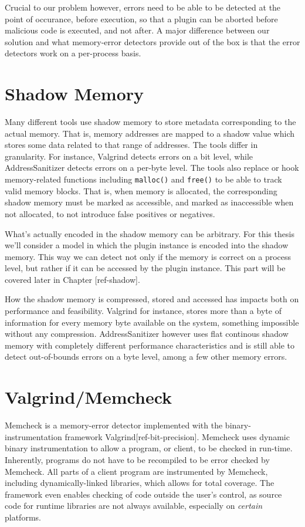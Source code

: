 Crucial to our problem however, errors need to be able to be detected at the
point of occurance, before execution, so that a plugin can be aborted before
malicious code is executed, and not after.
A major difference between our solution and what memory-error detectors provide
out of the box is that the error detectors work on a per-process basis.


\section {Shadow Memory}

Many different tools use shadow memory to store metadata corresponding to the
actual memory.
That is, memory addresses are mapped to a shadow value which stores some data
related to that range of addresses.
The tools differ in granularity.
For instance, Valgrind detects errors on a bit level, while AddressSanitizer
detects errors on a per-byte level.
The tools also replace or hook memory-related functions including
\texttt{malloc()} and \texttt{free()} to be able to track valid memory blocks.
That is, when memory is allocated, the corresponding shadow memory must be
marked as accessible, and marked as inaccessible when not allocated, to not
introduce false positives or negatives.

What's actually encoded in the shadow memory can be arbitrary.
For this thesis we'll consider a model in which the plugin instance is encoded
into the shadow memory.
This way we can detect not only if the memory is correct on a process level, but
rather if it can be accessed by the plugin instance.
This part will be covered later in Chapter [ref-shadow].

How the shadow memory is compressed, stored and accessed has impacts both on
performance and feasibility.
Valgrind for instance, stores more than a byte of information for every memory
byte available on the system, something impossible without any compression.
AddressSanitizer however uses flat continous shadow memory with completely
different performance characteristics and is still able to detect out-of-bounds
errors on a byte level, among a few other memory errors.


\section {Valgrind/Memcheck}

Memcheck is a memory-error detector implemented with the binary-instrumentation
framework Valgrind[ref-bit-precision].
Memcheck uses dynamic binary instrumentation to allow a program, or client, to
be checked in run-time.
Inherently, programs do not have to be recompiled to be error checked by
Memcheck.
All parts of a client program are instrumented by Memcheck, including
dynamically-linked libraries, which allows for total coverage.
The framework even enables checking of code outside the user's control, as
source code for runtime libraries are not always available, especially on
\emph{certain} platforms.

